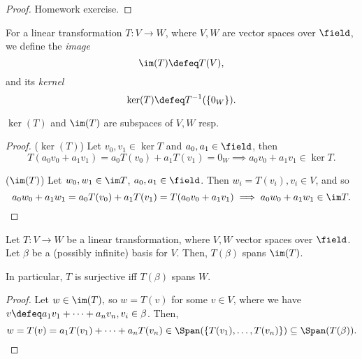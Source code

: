 \begin{proof}
    Homework exercise.
\end{proof}

\begin{definition}
    For a linear transformation $T: V \to W$, where $V, W$ are vector spaces over $\field$, we define the \emph{image} \[
        \im (T)  \defeq T(V),
    \]
    and its \emph{kernel} \[
    \ker (T) \defeq T^{-1}(\{0_W\}).
    \]
\end{definition}

\begin{proposition}
    $\ker (T)$ and $\im (T)$ are subspaces of $V, W$ resp.
\end{proposition}

\begin{proof}
 \noindent($\ker (T)$) Let $v_0, v_1 \in \ker T$ and $a_0, a_1 \in \field$, then \[
 T(a_0 v_0  + a_1 v_1) = a_0T(v_0) + a_1T(v_1) = 0_W \implies a_0v_0 + a_1v_1 \in \ker T.   
 \]

\noindent ($\im (T)$) Let $w_0, w_1 \in \im T$, $a_0, a_1 \in \field$. Then $w_i = T(v_i), v_i \in V$, and so \[
a_0 w_0 + a_1 w_1 = a_0 T(v_0) + a_1T(v_1) = T(a_0 v_0 + a_1 v_1) \implies a_0 w_0 + a_1 w_1 \in \im T.    
\]
\end{proof}

\begin{proposition}
    Let $T: V \to W$ be a linear transformation, where $V, W$ vector spaces over $\field$. Let $\beta$ be a (possibly infinite) basis for $V$. Then, $T (\beta)$ spans $\im (T)$. 
    
    In particular, $T$ is surjective iff $T(\beta)$ spans $W$.
\end{proposition}

\begin{proof}
    Let $w \in \im(T),$ so $w = T(v)$ for some $v \in V$, where we have $v\defeq a_1 v_1 + \cdots + a_n v_n, v_i \in \beta$. Then, \[
    w = T(v) = a_1 T(v_1) + \cdots + a_n T(v_n) \in \Span(\{T(v_1), \dots, T(v_n)\}) \subseteq \Span(T(\beta)).
    \]

\end{proof}